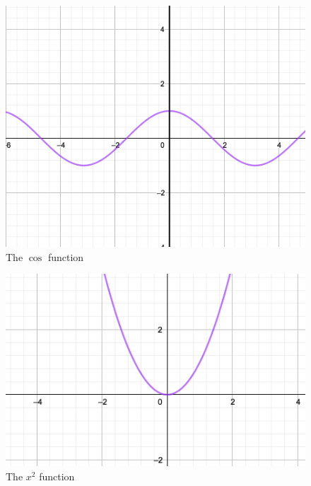 \documentclass{beamer}
\begin{document}
    \begin{frame}
        \begin{example}
            \begin{figure}
                \caption{The $\cos$ function}
                \includegraphics[scale=0.3]{images/cos.png}
            \end{figure}
        \end{example}
    \end{frame}
    \begin{frame}
        \begin{example}
            \begin{figure}
                \caption{The $x^2$ function}
                \includegraphics[scale=0.3]{images/x2-gtd-0.png}
            \end{figure}
        \end{example}
    \end{frame}
\end{document}
